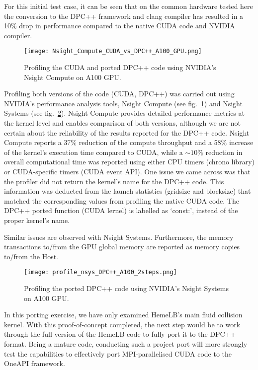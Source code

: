\documentclass[../main]{subfiles}
\begin{document}
For this initial test case, it can be seen that on the common hardware tested here the conversion to the DPC++ framework and clang compiler has resulted in a 10\% drop in performance compared to the native CUDA code and NVIDIA compiler.

\begin{figure}[htp]
	\centering
	\texttt{[image: Nsight\_Compute\_CUDA\_vs\_DPC++\_A100\_GPU.png]}
	\caption{Profiling the CUDA and ported DPC++ code using NVIDIA's Nsight Compute on A100 GPU.}
	\label{fig:ncu_CUDA_Vs_DPC++_A100GPU}
\end{figure}

Profiling both versions of the code (CUDA, DPC++) was carried out using NVIDIA's performance analysis tools, Nsight Compute (see fig.~\ref{fig:ncu_CUDA_Vs_DPC++_A100GPU}) and Nsight Systems (see fig.~\ref{fig:nsys_DPC++_A100GPU}).
Nsight Compute provides detailed performance metrics at the kernel level and enables comparison of both versions, although we are not certain about the reliability of the results reported for the DPC++ code.
Nsight Compute reports a 37\% reduction of the compute throughput and a 58\% increase of the kernel's execution time compared to CUDA, while a $\sim10\%$ reduction in overall computational time was reported using either CPU timers (chrono library) or CUDA-specific timers (CUDA event API).
One issue we came across was that the profiler did not return the kernel's name for the DPC++ code.
This information was deducted from the launch statistics (gridsize and blocksize) that matched the corresponding values from profiling the native CUDA code.
The DPC++ ported function (CUDA lernel) is labelled as `const:', instead of the proper kernel's name.


Similar issues are observed with Nsight Systems.
Furthermore, the memory transactions to/from the GPU global memory are reported as memory copies to/from the Host.


\begin{figure}[htp]
	\centering
	\texttt{[image: profile\_nsys\_DPC++\_A100\_2steps.png]}
	\caption{Profiling the ported DPC++ code using NVIDIA's Nsight Systems on A100 GPU.}
	\label{fig:nsys_DPC++_A100GPU}
\end{figure}

In this porting exercise, we have only examined HemeLB's main fluid collision kernel.
With this proof-of-concept completed, the next step would be to work through the full version of the HemeLB code to fully port it to the DPC++ format.
Being a mature code, conducting such a project port will more strongly test the capabilities to effectively port MPI-parallelised CUDA code to the OneAPI framework.
\end{document}
